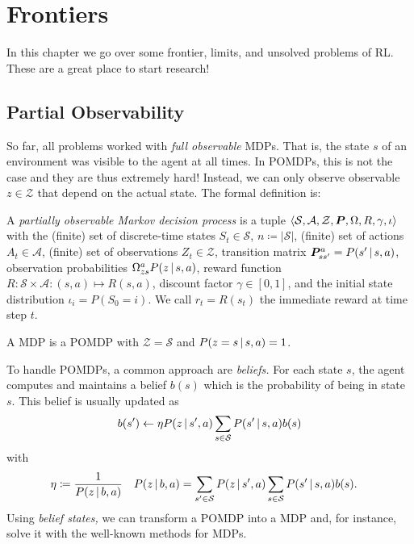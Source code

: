 \chapter{Frontiers}
	In this chapter we go over some frontier, limits, and unsolved problems of \ac{RL}. These are a great place to start research!

	\section{Partial Observability}
		So far, all problems worked with \emph{full observable} \acp{MDP}. That is, the state \(s\) of an environment was visible to the agent at all times. In \acp{POMDP}, this is not the case and they are thus extremely hard! Instead, we can only observe observable \(z \in \mathcal{Z}\) that depend on the actual state. The formal definition is:
		\begin{definition}
			A \emph{partially observable Markov decision process} is a tuple \( \langle \mathcal{S}, \mathcal{A}, \mathcal{Z}, \bm{P}, \Omega, R, \gamma, \iota \rangle \) with the (finite) set of discrete-time states \(S_t \in \mathcal{S}\), \(n \coloneqq \lvert \mathcal{S} \rvert\), (finite) set of actions \(A_t \in \mathcal{A}\), (finite) set of observations \(Z_t \in \mathcal{Z}\), transition matrix \( \bm{P}_{ss'}^{a} = P(s' \,\vert\, s, a) \), observation probabilities \( \Omega_{zs}^{a} P(z \,\vert\, s, a) \), reward function \( R : \mathcal{S} \times \mathcal{A} : (s, a) \mapsto R(s, a) \), discount factor \( \gamma \in [0, 1] \), and the initial state distribution \( \iota_i = P(S_0 = i) \). We call \( r_t = R(s_t) \) the immediate reward at time step \(t\).
		\end{definition}
		\begin{remark}
			A \ac{MDP} is a \ac{POMDP} with \(\mathcal{Z} = \mathcal{S}\) and \( P(z = s \,\vert\, s, a) = 1 \).
		\end{remark}
		To handle \acp{POMDP}, a common approach are \emph{beliefs.} For each state \(s\), the agent computes and maintains a belief \(b(s)\) which is the probability of being in state \(s\). This belief is usually updated as
		\begin{equation}
			b(s') \gets \eta P(z \,\vert\, s', a) \sum_{s \in \mathcal{S}} P(s' \,\vert\, s, a) b(s)
		\end{equation}
		with
		\begin{align}
			\eta             & \coloneqq \frac{1}{P(z \,\vert\, b, a)}                                                           &
			P(z \,\vert\, b, a) & = \sum_{s' \in \mathcal{S}} P(z \,\vert\, s', a) \sum_{s \in \mathcal{S}} P(s' \,\vert\, s, a) b(s).
		\end{align}
		Using \emph{belief states,} we can transform a \ac{POMDP} into a \ac{MDP} and, for instance, solve it with the well-known methods for \acp{MDP}.

